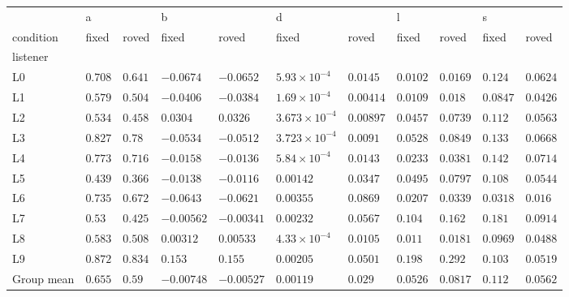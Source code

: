 \begin{tabular}{lllllllllll}
\toprule
{} & \multicolumn{2}{l}{a} & \multicolumn{2}{l}{b} & \multicolumn{2}{l}{d} & \multicolumn{2}{l}{l} & \multicolumn{2}{l}{s} \\
condition &    fixed &    roved &       fixed &       roved &                   fixed &      roved &     fixed &     roved &     fixed &     roved \\
listener   &          &          &             &             &                         &            &           &           &           &           \\
\midrule
L0         &  $0.708$ &  $0.641$ &   $-0.0674$ &   $-0.0652$ &   $5.93 \times 10^{-4}$ &   $0.0145$ &  $0.0102$ &  $0.0169$ &   $0.124$ &  $0.0624$ \\
L1         &  $0.579$ &  $0.504$ &   $-0.0406$ &   $-0.0384$ &   $1.69 \times 10^{-4}$ &  $0.00414$ &  $0.0109$ &   $0.018$ &  $0.0847$ &  $0.0426$ \\
L2         &  $0.534$ &  $0.458$ &    $0.0304$ &    $0.0326$ &  $3.673 \times 10^{-4}$ &  $0.00897$ &  $0.0457$ &  $0.0739$ &   $0.112$ &  $0.0563$ \\
L3         &  $0.827$ &   $0.78$ &   $-0.0534$ &   $-0.0512$ &  $3.723 \times 10^{-4}$ &   $0.0091$ &  $0.0528$ &  $0.0849$ &   $0.133$ &  $0.0668$ \\
L4         &  $0.773$ &  $0.716$ &   $-0.0158$ &   $-0.0136$ &   $5.84 \times 10^{-4}$ &   $0.0143$ &  $0.0233$ &  $0.0381$ &   $0.142$ &  $0.0714$ \\
L5         &  $0.439$ &  $0.366$ &   $-0.0138$ &   $-0.0116$ &               $0.00142$ &   $0.0347$ &  $0.0495$ &  $0.0797$ &   $0.108$ &  $0.0544$ \\
L6         &  $0.735$ &  $0.672$ &   $-0.0643$ &   $-0.0621$ &               $0.00355$ &   $0.0869$ &  $0.0207$ &  $0.0339$ &  $0.0318$ &   $0.016$ \\
L7         &   $0.53$ &  $0.425$ &  $-0.00562$ &  $-0.00341$ &               $0.00232$ &   $0.0567$ &   $0.104$ &   $0.162$ &   $0.181$ &  $0.0914$ \\
L8         &  $0.583$ &  $0.508$ &   $0.00312$ &   $0.00533$ &   $4.33 \times 10^{-4}$ &   $0.0105$ &   $0.011$ &  $0.0181$ &  $0.0969$ &  $0.0488$ \\
L9         &  $0.872$ &  $0.834$ &     $0.153$ &     $0.155$ &               $0.00205$ &   $0.0501$ &   $0.198$ &   $0.292$ &   $0.103$ &  $0.0519$ \\
Group mean &  $0.655$ &   $0.59$ &  $-0.00748$ &  $-0.00527$ &               $0.00119$ &    $0.029$ &  $0.0526$ &  $0.0817$ &   $0.112$ &  $0.0562$ \\
\bottomrule
\end{tabular}
